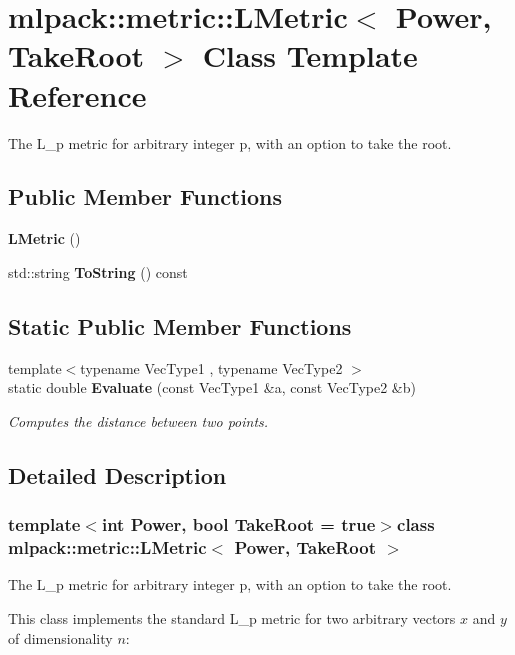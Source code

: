 \section{mlpack\-:\-:metric\-:\-:L\-Metric$<$ Power, Take\-Root $>$ Class Template Reference}
\label{classmlpack_1_1metric_1_1LMetric}


The L\-\_\-p metric for arbitrary integer p, with an option to take the root.  


\subsection*{Public Member Functions}
\begin{DoxyCompactItemize}
\item 
{\bf L\-Metric} ()
\item 
std\-::string {\bf To\-String} () const 
\end{DoxyCompactItemize}
\subsection*{Static Public Member Functions}
\begin{DoxyCompactItemize}
\item 
{\footnotesize template$<$typename Vec\-Type1 , typename Vec\-Type2 $>$ }\\static double {\bf Evaluate} (const Vec\-Type1 \&a, const Vec\-Type2 \&b)
\begin{DoxyCompactList}\small\item\em Computes the distance between two points. \end{DoxyCompactList}\end{DoxyCompactItemize}


\subsection{Detailed Description}
\subsubsection*{template$<$int Power, bool Take\-Root = true$>$class mlpack\-::metric\-::\-L\-Metric$<$ Power, Take\-Root $>$}

The L\-\_\-p metric for arbitrary integer p, with an option to take the root. 

This class implements the standard L\-\_\-p metric for two arbitrary vectors $ x $ and $ y $ of dimensionality $ n $\-:

